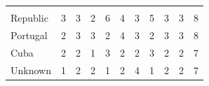 \documentclass[12pt]{article}  %
\begin{document}
\begin{subappendices}
\begin{longtable}{|l|c|c|c|c|c|c|c|c|c|c|}
	\hline
	\begin{tabular}[c]{@{}l@{}}Dominican \\Republic\end{tabular}   & 3                                                                      & 3                                                                      & 2                                                                      & 6                                                                      & 4                                                                      & 3                                                                      & 5                         & 3                           & 3                           & 8                           \\ 
	\hline
	Portugal                                                       & 2                                                                      & 3                                                                      & 3                                                                      & 2                                                                      & 4                                                                      & 3                                                                      & 2                         & 3                           & 3                           & 8                           \\ 
	\hline
	Cuba                                                           & 2                                                                      & 2                                                                      & 1                                                                      & 3                                                                      & 2                                                                      & 2                                                                      & 3                         & 2                           & 2                           & 7                           \\ 
	\hline
	Unknown                                                        & 1                                                                      & 2                                                                      & 2                                                                      & 1                                                                      & 2                                                                      & 4                                                                      & 1                         & 2                           & 2                           & 7                           \\ 

\end{longtable}
\end{subappendices}
\end{document}
